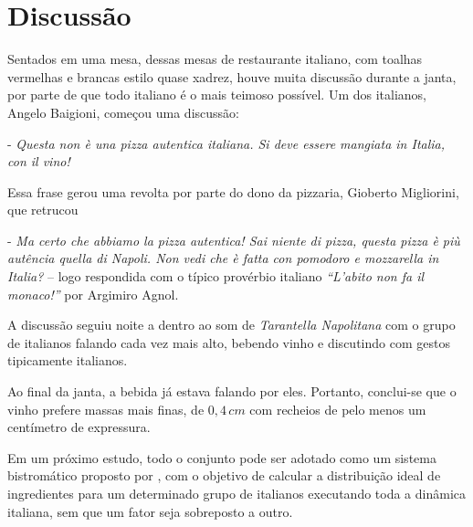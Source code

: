 \section{Discussão}

Sentados em uma mesa, dessas mesas de restaurante italiano, com toalhas 
vermelhas e brancas estilo quase xadrez,
houve muita discussão durante a janta, por parte de que todo italiano
é o mais teimoso possível.
Um dos italianos, Angelo Baigioni, começou uma discussão:
\par - \textsl{Questa non è una pizza autentica italiana. Si deve essere mangiata in 
Italia, con il vino!}

Essa frase gerou uma revolta por parte do dono da pizzaria, Gioberto Migliorini, que retrucou

\par - \textsl{Ma certo che abbiamo la pizza autentica! Sai niente di 
pizza, questa pizza è più autência quella di Napoli. Non vedi che è fatta con 
pomodoro e mozzarella in Italia?} -- logo respondida com o típico provérbio
italiano \textsl{``L'abito non fa il monaco!''} por Argimiro Agnol.

A discussão seguiu
noite a dentro ao som de \textsl{Tarantella Napolitana} com o grupo de 
italianos falando cada vez mais alto, bebendo vinho e discutindo com gestos
tipicamente italianos.

Ao final da janta, a bebida já estava falando por eles. Portanto, conclui-se que
o vinho prefere massas mais finas, de $0,4\,cm$ com recheios de pelo menos
um centímetro de expressura.

Em um próximo estudo, todo o conjunto pode ser adotado como um sistema
bistromático proposto por \cite{Bistromatic},  com o objetivo de calcular a distribuição ideal de ingredientes 
para um determinado grupo
de italianos executando toda a dinâmica italiana, sem que um fator seja 
sobreposto a outro.

